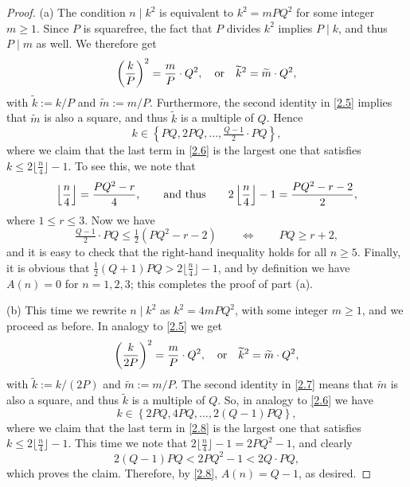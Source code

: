 \documentclass{amsart}
\theoremstyle{plain}
\numberwithin{equation}{section}
\begin{document}
\begin{proof}
(a) The condition $n\mid k^2$ is equivalent to $k^2=mPQ^2$ for some integer
$m\geq 1$. Since $P$ is squarefree, the fact that $P$ divides $k^2$ implies
$P\mid k$, and thus $P\mid m$ as well. We therefore get
\begin{equation}\label{2.5}
\left(\frac{k}{P}\right)^2 = \frac{m}{P}\cdot Q^2,\quad\hbox{or}\quad
\widetilde{k}^2=\widetilde{m}\cdot Q^2,
\end{equation}
with $\widetilde{k}:=k/P$ and $\widetilde{m}:=m/P$. Furthermore, the second
identity in \eqref{2.5} implies that $\widetilde{m}$ is also a square, and
thus $\widetilde{k}$ is a multiple of $Q$. Hence
\begin{equation}\label{2.6}
k\in\left\{PQ, 2PQ,\ldots,\tfrac{Q-1}{2}\cdot PQ\right\},
\end{equation}
where we claim that the last term in \eqref{2.6} is the largest one that 
satisfies $k\leq 2\lfloor\frac{n}{4}\rfloor-1$. To see this, we note that
\[
\left\lfloor\frac{n}{4}\right\rfloor=\frac{PQ^2-r}{4},\qquad\hbox{and thus}
\qquad 2\left\lfloor\frac{n}{4}\right\rfloor-1=\frac{PQ^2-r-2}{2},
\]
where $1\leq r\leq 3$. Now we have
\[
\tfrac{Q-1}{2}\cdot PQ \leq\tfrac{1}{2}\left(PQ^2-r-2\right)\qquad
\Leftrightarrow\qquad PQ \geq r+2,
\]
and it is easy to check that the right-hand inequality holds for all $n\geq 5$.
Finally, it is obvious that $\frac{1}{2}(Q+1)PQ>2\lfloor\frac{n}{4}\rfloor-1$,
and by definition we have $A(n)=0$ for $n=1, 2, 3$; this completes the proof
of part (a).

(b) This time we rewrite $n\mid k^2$ as $k^2=4mPQ^2$, with some integer 
$m\geq 1$, and we proceed as before. In analogy to \eqref{2.5} we get
\begin{equation}\label{2.7}
\left(\frac{k}{2P}\right)^2 = \frac{m}{P}\cdot Q^2,\quad\hbox{or}\quad
\widetilde{k}^2=\widetilde{m}\cdot Q^2,
\end{equation}
with $\widetilde{k}:=k/(2P)$ and $\widetilde{m}:=m/P$. The second identity in
\eqref{2.7} means that $\widetilde{m}$ is also a square, and thus 
$\widetilde{k}$ is a multiple of $Q$. So, in analogy to \eqref{2.6} we have
\begin{equation}\label{2.8}
k\in\left\{2PQ, 4PQ,\ldots, 2(Q-1)PQ\right\},
\end{equation}
where we claim that the last term in \eqref{2.8} is the largest one that
satisfies $k\leq 2\lfloor\frac{n}{4}\rfloor-1$. This time we note that
$2\lfloor\frac{n}{4}\rfloor-1=2PQ^2-1$, and clearly
\[
2(Q-1)PQ < 2PQ^2-1 < 2Q\cdot PQ,
\]
which proves the claim. Therefore, by \eqref{2.8}, $A(n)=Q-1$, as desired.
\end{proof}
\end{document}
